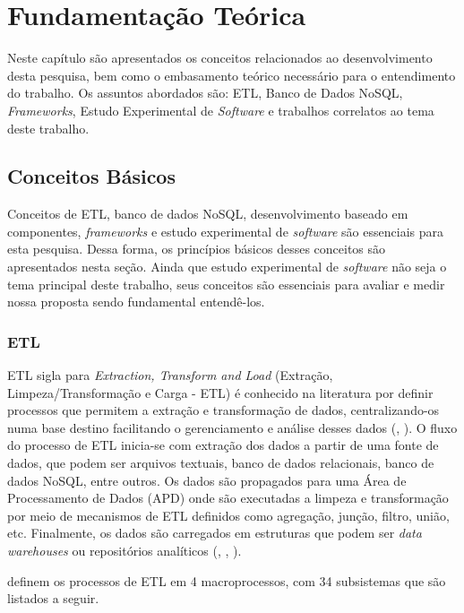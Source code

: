 \chapter{Fundamentação Teórica}

Neste capítulo são apresentados os conceitos relacionados ao desenvolvimento desta pesquisa, bem como o embasamento teórico necessário para o entendimento do trabalho. Os assuntos abordados são: ETL, Banco de Dados NoSQL, \textit{Frameworks}, Estudo Experimental de \textit{Software} e trabalhos correlatos ao tema deste trabalho.


\clearpage

\section{Conceitos Básicos}

Conceitos de ETL, banco de dados NoSQL, desenvolvimento baseado em componentes, \textit{frameworks} e estudo experimental de \textit{software} são essenciais para esta pesquisa. Dessa forma, os princípios básicos desses conceitos são apresentados nesta seção. Ainda que estudo experimental de \textit{software} não seja o tema principal deste trabalho, seus conceitos são essenciais para avaliar e medir nossa proposta sendo fundamental entendê-los.

\subsection{ETL}

ETL sigla para \textit{Extraction, Transform and Load} (Extração, Limpeza/Transformação e Carga - ETL) é conhecido na literatura por definir processos que permitem a extração e transformação de dados, centralizando-os numa base destino facilitando o gerenciamento e análise desses dados (\cite{kimball:2004}, \cite{rud:2009}). O fluxo do processo de ETL inicia-se com extração dos dados a partir de uma fonte de dados, que podem ser arquivos textuais, banco de dados relacionais, banco de dados NoSQL, entre outros. Os dados são propagados para uma Área de Processamento de Dados (APD) onde são executadas a limpeza e transformação por meio de mecanismos de ETL definidos como agregação, junção, filtro, união, etc. Finalmente, os dados são carregados em estruturas que podem ser \textit{data warehouses} ou repositórios analíticos (\cite{silva:2016}, \cite{silva:2012}, \cite{kimball:2004}). 

\cite{kimball:2004} definem os processos de ETL em 4 macroprocessos, com 34 subsistemas que são listados a seguir. 

